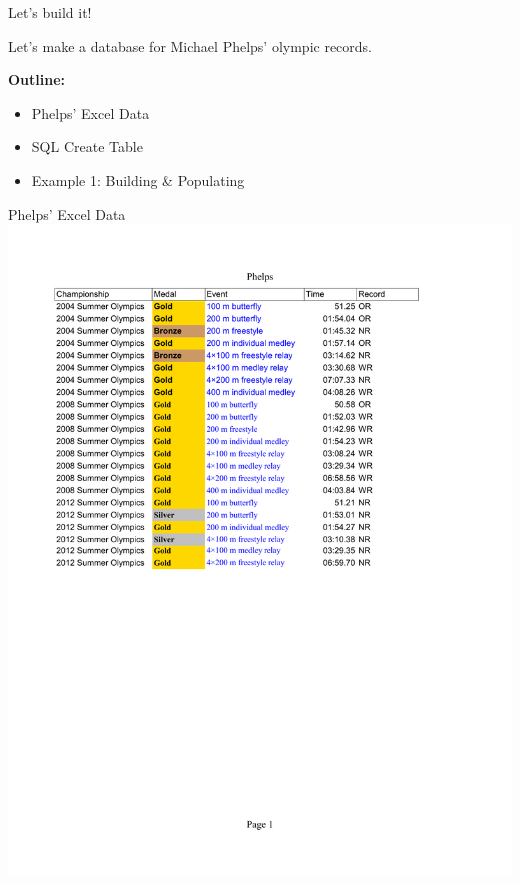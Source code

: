 \documentclass{beamer}
\begin{document}
\begin{frame}{Let's build it!}

\vspace{.5cm}Let's make a database for Michael Phelps' olympic records.

\vspace{12pt}
\large {\bf Outline:}
\begin{itemize}
\item Phelps' Excel Data
\item SQL Create Table
\item Example 1: Building \& Populating
\end{itemize}

\end{frame}
\begin{frame}{Phelps' Excel Data}
\includegraphics[scale=0.5]{phelps_table.pdf}
\end{frame}
\end{document}
